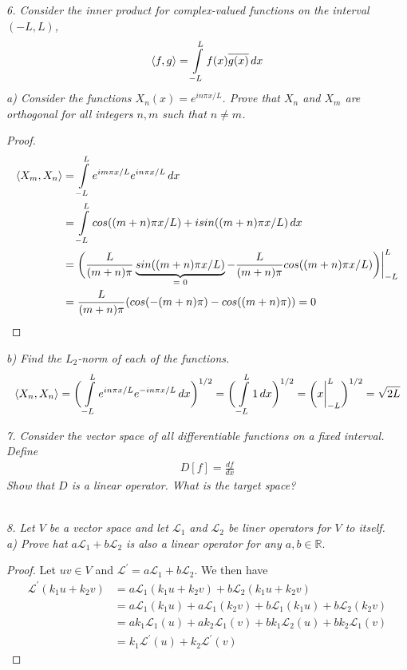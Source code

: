 \documentclass[12pt]{article}
\theoremstyle{remark}
\begin{document}
\newpage

\textit{6. Consider the inner product for complex-valued functions on the interval $(-L,L)$,}
\begin{align*}
	\braket{f,g} = \int\limits_{-L}^{L} f(x)\overline{g(x)} \, dx
\end{align*}
\textit{a) Consider the functions $X_n(x) = e^{in\pi x/L}$. Prove that $X_n$ and $X_m$ are orthogonal for all integers $n,m$ such that $n \neq m$.} \\
\begin{proof}
	\begin{align*}
		\braket{X_m, X_n} & = \int\limits_{-L}^L e^{im\pi x/L}e^{in\pi x/L} \, dx \\
		& = \int\limits_{-L}^L cos((m+n)\pi x/L) + isin((m+n)\pi x/L) \, dx \\
		& = \bigg(\frac{L}{(m+n)\pi}\underbrace{sin((m+n)\pi x/L)}_{\text{= 0}} - \frac{L}{(m+n)\pi}cos((m+n)\pi x/L)\bigg)\bigg\vert_{-L}^L \\
		& = \frac{L}{(m+n)\pi}(cos(-(m+n)\pi) - cos((m+n)\pi)) = 0
	\end{align*}
\end{proof}
\textit{b) Find the $L_2$-norm of each of the functions.} \\
\begin{align*}
	\braket{X_n,X_n} = \bigg(\int\limits_{-L}^L e^{in\pi x/L}e^{-in\pi x/L} \, dx \bigg)^{1/2} = \bigg(\int\limits_{-L}^L 1 \, dx \bigg)^{1/2} = \bigg(x\bigg\vert_{-L}^L\bigg)^{1/2} = \sqrt{2L}
\end{align*}

\newpage

\textit{7. Consider the vector space of all differentiable functions on a fixed interval. Define}
\begin{align*}
	D[f] = \frac{df}{dx}
\end{align*}
\textit{Show that $D$ is a linear operator. What is the target space?} \\ \\

\newpage

\textit{8. Let $V$ be a vector space and let $\mathcal{L}_1$ and $\mathcal{L}_2$ be liner operators for $V$ to itself.} \\
\textit{a) Prove hat $a\mathcal{L}_1 + b\mathcal{L}_2$ is also a linear operator for any $a,b \in \mathbb{R}$}.

\begin{proof}
	Let $u v \in V$ and $\mathcal{L}^\prime = a\mathcal{L}_1 + b\mathcal{L}_2$. We then have 
	\begin{align*}
		\mathcal{L}^\prime(k_1u + k_2v) & = a\mathcal{L}_1(k_1u + k_2v) + b\mathcal{L}_2(k_1u + k_2v) \\
		& = a\mathcal{L}_1(k_1u) + a\mathcal{L}_1(k_2v) + b\mathcal{L}_1(k_1u) + b\mathcal{L}_2(k_2v) \\
		& = ak_1\mathcal{L}_1(u) + ak_2\mathcal{L}_1(v) + bk_1\mathcal{L}_2(u) + bk_2\mathcal{L}_1(v) \\
		& = k_1\mathcal{L}^\prime(u) + k_2\mathcal{L}^\prime(v)
	\end{align*}
\end{proof}
\end{document}
